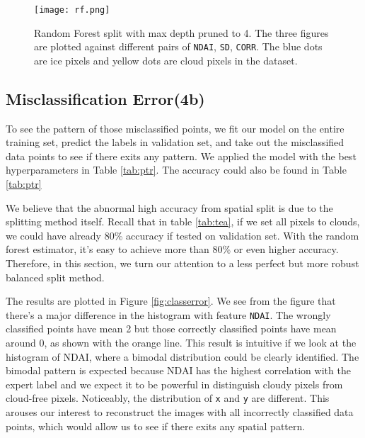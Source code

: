 \documentclass[letterpaper,11pt]{article}
\begin{document}
\begin{figure}[!hbt]
    \centering
    \texttt{[image: rf.png]}
    \caption{Random Forest split with max depth pruned to 4. The three figures are plotted against different pairs of \texttt{NDAI}, \texttt{SD}, \texttt{CORR}. The blue dots are ice pixels and yellow dots are cloud pixels in the dataset.}
    \label{fig:rfbound}
\end{figure}

\noindent


\subsection{Misclassification Error(4b)}
To see the pattern of those misclassified points, we fit our model on the entire training set, predict the labels in validation set, and take out the misclassified data points to see if there exits any pattern. We applied the model with the best hyperparameters in Table \ref{tab:ptr}. The accuracy could also be found in Table \ref{tab:ptr}

We believe that the abnormal high accuracy from spatial split is due to the splitting method itself. Recall that in table \ref{tab:tea}, if we set all pixels to clouds, we could have already 80\% accuracy if tested on validation set. With the random forest estimator, it's easy to achieve more than 80\% or even higher accuracy. Therefore, in this section, we turn our attention to a less perfect but more robust balanced split method.

The results are plotted in Figure \ref{fig:classerror}. We see from the figure that there's a major difference in the histogram with feature \texttt{NDAI}. The wrongly classified points have mean 2 but those correctly classified points have mean around 0, as shown with the orange line. This result is intuitive if we look at the histogram of NDAI, where a bimodal distribution could be clearly identified. The bimodal pattern is expected because NDAI has the highest correlation with the expert label and we expect it to be powerful in distinguish cloudy pixels from cloud-free pixels. Noticeably, the distribution of \texttt{x} and \texttt{y} are different. This arouses our interest to reconstruct the images with all incorrectly classified data points, which would allow us to see if there exits any spatial pattern. 
\end{document}
